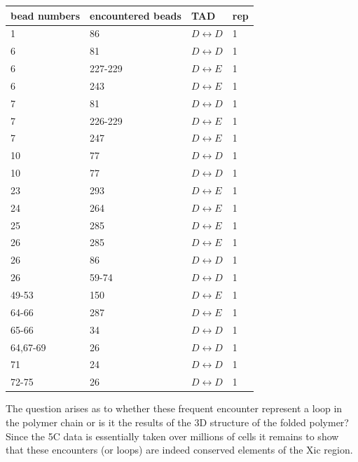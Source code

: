 \documentclass[12pt]{paper}
\begin{document}
\begin{table}[H]
\begin{tabular}{l l l l}
bead numbers & encountered beads & TAD & rep\\
\hline
1       & 86      & $D\leftrightarrow D$& 1 \\
6       & 81      & $D\leftrightarrow D$& 1 \\
6       & 227-229 & $D\leftrightarrow E$& 1 \\
6       & 243     & $D\leftrightarrow E$& 1 \\
7       & 81      & $D\leftrightarrow D$& 1 \\
7       & 226-229 & $D\leftrightarrow E$& 1 \\
7       & 247     & $D\leftrightarrow E$& 1 \\
10      & 77      & $D\leftrightarrow D$& 1 \\
10      & 77      & $D\leftrightarrow D$& 1 \\
23      & 293     & $D\leftrightarrow E$& 1 \\
24      & 264     & $D\leftrightarrow E$& 1 \\
25      & 285     & $D\leftrightarrow E$& 1 \\
26      & 285     & $D\leftrightarrow E$& 1 \\
26      & 86      & $D\leftrightarrow D$& 1 \\
26      & 59-74   & $D\leftrightarrow D$& 1 \\
49-53   & 150     & $D\leftrightarrow E$& 1 \\
64-66   & 287     & $D\leftrightarrow E$& 1 \\
65-66   & 34      & $D\leftrightarrow D$& 1 \\ 
64,67-69& 26      & $D\leftrightarrow D$& 1 \\       
71      & 24      & $D\leftrightarrow D$& 1 \\
72-75   & 26      & $D\leftrightarrow D$& 1 \\

\end{tabular}
\end{table}

The question arises as to whether these frequent encounter represent a loop in the polymer chain or is it the results of the 3D structure of the folded polymer? Since the 5C data is essentially taken over millions of cells it remains to show that these encounters (or loops) are indeed conserved elements of the Xic region.
\end{document}
